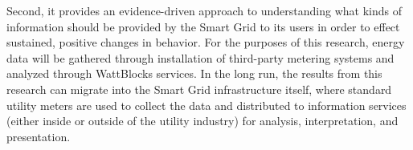 Second, it provides an evidence-driven approach to understanding what kinds
of information should be provided by the Smart Grid to its users in order
to effect sustained, positive changes in behavior.  For the purposes of
this research, energy data will be gathered through installation of
third-party metering systems and analyzed through WattBlocks services. In
the long run, the results from this research can migrate into the Smart
Grid infrastructure itself, where standard utility meters are used to
collect the data and distributed to information services (either inside or
outside of the utility industry) for analysis, interpretation, and
presentation.










